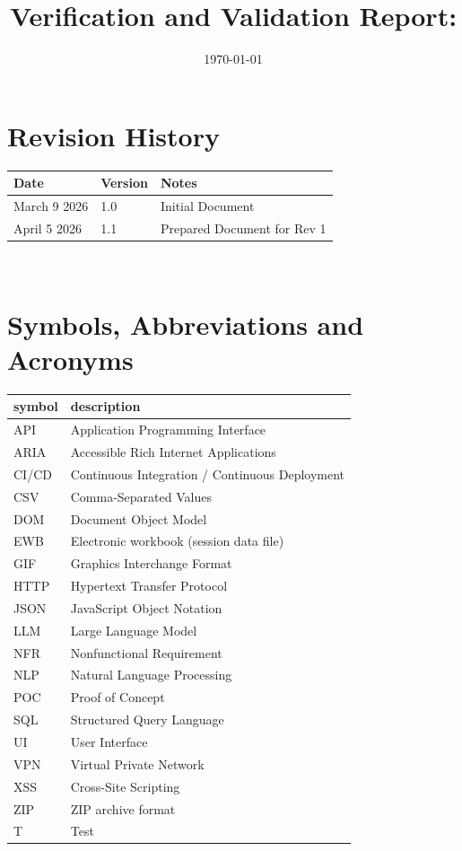 \documentclass[12pt, titlepage]{article}
\begin{document}
\title{Verification and Validation Report: \progname} 
\author{\authname}
\date{\today}
	
\maketitle


\section{Revision History}

\begin{tabularx}{\textwidth}{p{3cm}p{2cm}X}
\toprule {\bf Date} & {\bf Version} & {\bf Notes}\\
\midrule
March 9 2026 & 1.0 & Initial Document\\
April 5 2026 & 1.1 & Prepared Document for Rev 1\\
\bottomrule
\end{tabularx}

~\newpage

\section{Symbols, Abbreviations and Acronyms}

\renewcommand{\arraystretch}{1.2}
\begin{tabular}{l l} 
  \toprule		
  \textbf{symbol} & \textbf{description}\\
  \midrule 
  API & Application Programming Interface\\
  ARIA & Accessible Rich Internet Applications\\
  CI/CD & Continuous Integration / Continuous Deployment\\
  CSV & Comma-Separated Values\\
  DOM & Document Object Model\\
  EWB & Electronic workbook (session data file)\\
  GIF & Graphics Interchange Format\\
  HTTP & Hypertext Transfer Protocol\\
  JSON & JavaScript Object Notation\\
  LLM & Large Language Model\\
  NFR & Nonfunctional Requirement\\
  NLP & Natural Language Processing\\
  POC & Proof of Concept\\
  SQL & Structured Query Language\\
  UI & User Interface\\
  VPN & Virtual Private Network\\
  XSS & Cross-Site Scripting\\
  ZIP & ZIP archive format\\
  T & Test\\
  \bottomrule
\end{tabular}\\
\end{document}

